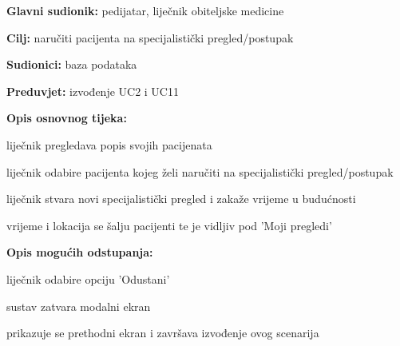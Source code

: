      
                    \noindent {}
					\begin{packed_item}
	
						\item \textbf{Glavni sudionik: }pedijatar, liječnik obiteljske medicine
						\item  \textbf{Cilj:} naručiti pacijenta na specijalistički pregled/postupak
						\item  \textbf{Sudionici:} baza podataka
						\item  \textbf{Preduvjet:} izvođenje UC2 i UC11
						\item  \textbf{Opis osnovnog tijeka:}
						
						\item[] \begin{packed_enum}
							
							\item liječnik pregledava popis svojih pacijenata
							\item liječnik odabire pacijenta kojeg želi naručiti na specijalistički pregled/postupak
							\item liječnik stvara novi specijalistički pregled i zakaže vrijeme u budućnosti
                            \item vrijeme i lokacija se šalju pacijenti te je vidljiv pod 'Moji pregledi'

						\end{packed_enum}
						\item  \textbf{Opis mogućih odstupanja:}
						
						\item[] \begin{packed_item}
	
							\item[5.a] liječnik odabire opciju 'Odustani'
							\item [] \begin{packed_enum}
								\item sustav zatvara modalni ekran
								\item prikazuje se prethodni ekran i završava izvođenje ovog scenarija
							\end{packed_enum}
						\end{packed_item}
					\end{packed_item}



